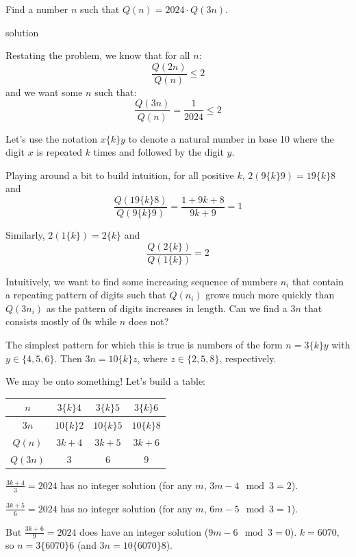 \documentclass[11pt, oneside]{amsart}
\newcommand{\solution}[0]{{\sc solution}}
\begin{document}
Find a number $n$ such that $Q(n) = 2024 \cdot Q(3n)$.

\solution

Restating the problem, we know that for all $n$:
\[ \frac{Q(2n)}{Q(n)} \leq 2 \]
and we want some $n$ such that:
\[ \frac{Q(3n)}{Q(n)} = \frac{1}{2024} \leq 2 \]

Let's use the notation $x\{k\}y$ to denote a natural number in base 10 where the digit $x$ is repeated $k$ times
and followed by the digit $y$.

Playing around a bit to build intuition, for all positive $k$, $2(9\{k\}9) = 19\{k\}8$ and
\[ \frac{Q(19\{k\}8)}{Q(9\{k\}9)} = \frac{1+9k+8}{9k+9} = 1\]

Similarly, $2(1\{k\}) = 2\{k\}$ and
\[ \frac{Q(2\{k\})}{Q(1\{k\})} = 2\]

Intuitively, we want to find some increasing sequence of numbers $n_i$ that contain a repeating pattern of digits
such that $Q(n_i)$ grows much more quickly than $Q(3n_i)$ as the pattern of digits increases in length.
Can we find a $3n$ that consists mostly of 0s while $n$ does not?

The simplest pattern for which this is true is numbers of the form $n = 3\{k\}y$ with $y \in \{ 4, 5, 6 \}$. Then
$3n = 10\{k\}z$, where $z \in \{ 2, 5, 8 \}$, respectively.

We may be onto something! Let's build a table:

\begin{table}[h!]
\centering
\begin{tabular}{|c|c|c|c|}
	\hline
	$n$      & $3\{k\}4$    & $3\{k\}5$    & $3\{k\}6$ \\
	\hline
	$3n$     & $10\{k\}2$   & $10\{k\}5$   & $10\{k\}8$ \\
	\hline
	$Q(n)$   & $3k+4$       & $3k+5$       & $3k+6$ \\
	\hline
	$Q(3n)$  & $3$          & $6$          & $9$ \\
	\hline
\end{tabular}
\end{table}

$\frac{3k+4}{3} = 2024$ has no integer solution (for any $m$, $3m-4 \mod 3 = 2$).

$\frac{3k+5}{6} = 2024$ has no integer solution (for any $m$, $6m-5 \mod 3 = 1$).

But $\frac{3k+6}{9} = 2024$ does have an integer solution ($9m-6 \mod 3 = 0$). $k = 6070$,
so $n = 3\{6070\}6$ (and $3n = 10\{6070\}8$).
\end{document}
